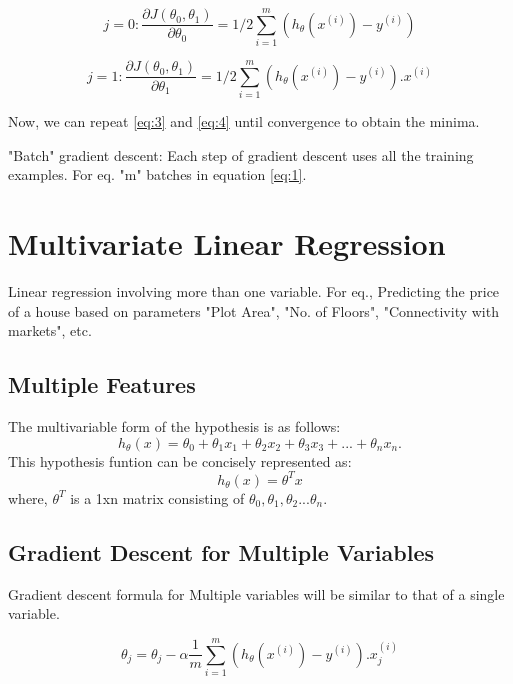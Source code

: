 \documentclass[12pt, A4]{report}
\begin{document}
    \begin{equation} \label {eq:3}
        j = 0 : \frac{\partial {J(\theta_0, \theta_1)}}{\partial \theta_0} = 1/2 \sum_{i=1}^{m} (h_\theta(x^{(i)})-y^{(i)}) 
    \end{equation}

    \begin{equation} \label {eq:4}
        j = 1 : \frac{\partial {J(\theta_0, \theta_1)}}{\partial \theta_1} = 1/2 \sum_{i=1}^{m} (h_\theta(x^{(i)})-y^{(i)}).x^{(i)}
    \end{equation}

    Now, we can repeat \ref{eq:3} and \ref{eq:4} until convergence to obtain the minima.

    "Batch" gradient descent: Each step of gradient descent uses all the training examples.
    For eq. "m" batches in equation \ref{eq:1}.


\section{Multivariate Linear Regression}
  Linear regression involving more than one variable. For eq., Predicting the price of a house based on parameters "Plot Area", "No. of Floors", "Connectivity with markets", etc.

  \subsection{Multiple Features}
    The multivariable form of the hypothesis is as follows:
    \begin{equation} \label {eq:5}
        h_\theta(x) = \theta_0 + \theta_1x_1 + \theta_2x_2 + \theta_ 3x_3 + ... + \theta_{n}x_n.    
    \end{equation}
    This hypothesis funtion can be concisely represented as:
    \begin{equation}
        h_\theta(x) = \theta^{T}x
    \end{equation}
    where, $ \theta^T $ is a 1xn matrix consisting of $ \theta_0, \theta_1, \theta_2 ... \theta_n $.


  \subsection{Gradient Descent for Multiple Variables}
    Gradient descent formula for Multiple variables will be similar to that of a single variable.

    \begin{equation} \label {eq: GD for multiple}
        \theta_j =  \theta_j - \alpha \frac{1}{m} \sum_{i=1}^{m} (h_\theta(x^{(i)})-y^{(i)}).x_j^{(i)}
    \end{equation}
\end{document}
